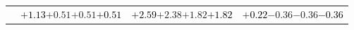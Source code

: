 \documentclass[compress]{beamer}
\begin{document}
\begin{frame}
\begin{tabular}{r | c | c | c}
          & \textcolor{black}{$+1.13$}\hspace{0.1 cm}$+0.51$\hspace{0.1 cm}$+0.51$\hspace{0.1 cm}\textcolor{black}{$+0.51$} & \textcolor{black}{$+2.59$}\hspace{0.1 cm}$+2.38$\hspace{0.1 cm}$+1.82$\hspace{0.1 cm}\textcolor{black}{$+1.82$} & \textcolor{black}{$+0.22$}\hspace{0.1 cm}$-0.36$\hspace{0.1 cm}$-0.36$\hspace{0.1 cm}\textcolor{black}{$-0.36$} \\
\end{tabular}
\end{frame}
\end{document}
